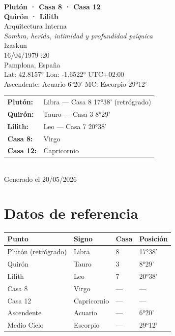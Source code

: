 \documentclass[11pt,a4paper]{article}
\begin{document}
\begin{titlepage}
  \centering
  \vspace*{1.5cm}
  {\Huge\bfseries\color{azulai} Plutón · Casa 8 · Casa 12}\\[0.35cm]
  {\Huge\bfseries\color{azulai} Quirón · Lilith}\\[0.5cm]
  {\large\color{grisai} Arquitectura Interna}\\[0.3cm]
  {\small\itshape\color{grisai} Sombra, herida, intimidad y profundidad psíquica}\\[2cm]
  {\huge\color{doradoai} Izaskun}\\[1.5cm]
  {\Large 16/04/1979 :20}\\[0.3cm]
  {\Large Pamplona, España}\\[0.3cm]
  {\normalsize Lat: 42.8157° \quad Lon: -1.6522° \quad UTC+02:00}\\[0.3cm]
  {\normalsize Ascendente: Acuario 6°20' \quad
    MC: Escorpio 29°12'}\\[2cm]

  \begin{tabular}{ll}
    \textbf{Plutón:}  & Libra — Casa 8 17°38' (retrógrado) \\
    \textbf{Quirón:}  & Tauro — Casa 3 8°29' \\
    \textbf{Lilith:}  & Leo — Casa 7 20°38' \\
    \textbf{Casa 8:}  & Virgo \\
    \textbf{Casa 12:} & Capricornio \\
  \end{tabular}\\[2cm]

  \vfill
  {\small Generado el 20/05/2026}
\end{titlepage}

\tableofcontents
\newpage

\section{Datos de referencia}

\begin{center}
\begin{tabular}{llll}
  \toprule
  \textbf{Punto} & \textbf{Signo} & \textbf{Casa} & \textbf{Posición} \\
  \midrule
  Plutón (retrógrado) & Libra & 8 & 17°38' \\
  Quirón & Tauro & 3 & 8°29' \\
  Lilith          & Leo & 7 & 20°38' \\
  Casa 8          & Virgo             & ---                  & --- \\
  Casa 12         & Capricornio            & ---                  & --- \\
  Ascendente      & Acuario         & ---                  & 6°20' \\
  Medio Cielo     & Escorpio          & ---                  & 29°12' \\
  \bottomrule
\end{tabular}
\end{center}
\end{document}
